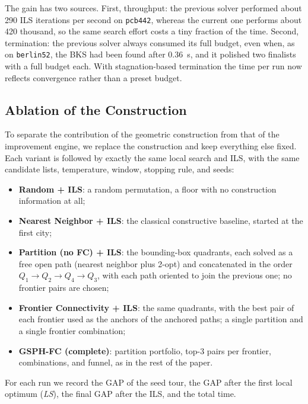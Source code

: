 \documentclass[runningheads]{llncs}
\begin{document}
The gain has two sources. First, throughput: the previous solver
performed about 290 ILS iterations per second on \texttt{pcb442},
whereas the current one performs about 420 thousand, so the
same search effort costs a tiny fraction of the time. Second,
termination: the previous solver always consumed its full budget, even
when, as on \texttt{berlin52}, the BKS had been found after 0.36~s,
and it polished two finalists with a full budget each. With
stagnation-based termination the time per run now reflects
convergence rather than a preset budget.

\subsection{Ablation of the Construction}
\label{sec:ablation}

To separate the contribution of the geometric construction from that of
the improvement engine, we replace the construction and keep everything
else fixed. Each variant is followed by exactly the same local search
and ILS, with the same candidate lists, temperature, window, stopping
rule, and seeds:
\begin{itemize}
  \item \textbf{Random + ILS}: a random permutation, a floor with no
    construction information at all;
  \item \textbf{Nearest Neighbor + ILS}: the classical constructive
    baseline, started at the first city;
  \item \textbf{Partition (no FC) + ILS}: the bounding-box quadrants,
    each solved as a free open path (nearest neighbor plus 2-opt) and
    concatenated in the order $Q_1\!\to\!Q_2\!\to\!Q_4\!\to\!Q_3$, with
    each path oriented to join the previous one; no frontier pairs are
    chosen;
  \item \textbf{Frontier Connectivity + ILS}: the same quadrants, with the
    best pair of each frontier used as the anchors of the anchored paths;
    a single partition and a single frontier combination;
  \item \textbf{GSPH-FC (complete)}: partition portfolio, top-3 pairs per
    frontier, combinations, and funnel, as in the rest of the paper.
\end{itemize}
For each run we record the GAP of the seed tour, the GAP after the first
local optimum (\emph{LS}), the final GAP after the ILS, and the total
time.
\end{document}
